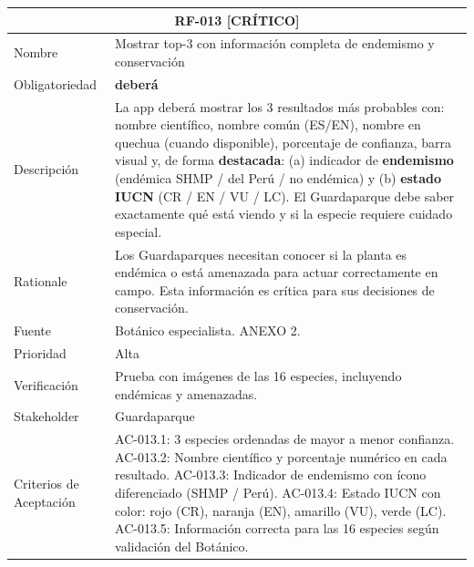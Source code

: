 \documentclass[12pt, a4paper]{article}
\newcommand{\criticomark}{\textcolor{criticolor}{\textbf{[CR\'ITICO]}}}
\begin{document}
\begin{longtable}{|p{3cm}|p{11.5cm}|}
\hline
\multicolumn{2}{|c|}{\textbf{RF-013} \criticomark} \\
\hline
Nombre & Mostrar top-3 con informaci\'on completa de endemismo y conservaci\'on \\
\hline
Obligatoriedad & \textbf{deber\'a} \\
\hline
Descripci\'on & La app deber\'a mostrar los 3 resultados m\'as probables con: nombre cient\'ifico, nombre com\'un (ES/EN), nombre en quechua (cuando disponible), porcentaje de confianza, barra visual y, de forma \textbf{destacada}: (a) indicador de \textbf{endemismo} (end\'emica SHMP / del Per\'u / no end\'emica) y (b) \textbf{estado IUCN} (CR / EN / VU / LC). El Guardaparque debe saber exactamente qu\'e est\'a viendo y si la especie requiere cuidado especial. \\
\hline
Rationale & Los Guardaparques necesitan conocer si la planta es end\'emica o est\'a amenazada para actuar correctamente en campo. Esta informaci\'on es cr\'itica para sus decisiones de conservaci\'on. \\
\hline
Fuente & Bot\'anico especialista. ANEXO 2. \\
\hline
Prioridad & Alta \\
\hline
Verificaci\'on & Prueba con im\'agenes de las 16 especies, incluyendo end\'emicas y amenazadas. \\
\hline
Stakeholder & Guardaparque \\
\hline
Criterios de Aceptaci\'on &
AC-013.1: 3 especies ordenadas de mayor a menor confianza. \newline
AC-013.2: Nombre cient\'ifico y porcentaje num\'erico en cada resultado. \newline
AC-013.3: Indicador de endemismo con \'icono diferenciado (SHMP / Per\'u). \newline
AC-013.4: Estado IUCN con color: rojo (CR), naranja (EN), amarillo (VU), verde (LC). \newline
AC-013.5: Informaci\'on correcta para las 16 especies seg\'un validaci\'on del Bot\'anico. \\
\hline
\end{longtable}
\end{document}

